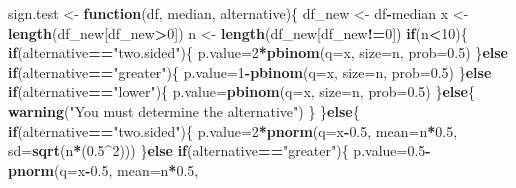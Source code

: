 \documentclass[]{book}
\newenvironment{Shaded}{\begin{snugshade}}{\end{snugshade}}
\newcommand{\KeywordTok}[1]{\textcolor[rgb]{0.13,0.29,0.53}{\textbf{#1}}}
\newcommand{\DataTypeTok}[1]{\textcolor[rgb]{0.13,0.29,0.53}{#1}}
\newcommand{\DecValTok}[1]{\textcolor[rgb]{0.00,0.00,0.81}{#1}}
\newcommand{\FloatTok}[1]{\textcolor[rgb]{0.00,0.00,0.81}{#1}}
\newcommand{\StringTok}[1]{\textcolor[rgb]{0.31,0.60,0.02}{#1}}
\newcommand{\ControlFlowTok}[1]{\textcolor[rgb]{0.13,0.29,0.53}{\textbf{#1}}}
\newcommand{\OperatorTok}[1]{\textcolor[rgb]{0.81,0.36,0.00}{\textbf{#1}}}
\newcommand{\NormalTok}[1]{#1}
\begin{document}
\begin{Shaded}
\begin{Highlighting}[]
\NormalTok{sign.test <-}\StringTok{ }\ControlFlowTok{function}\NormalTok{(df, median, alternative)\{}
\NormalTok{  df_new <-}\StringTok{ }\NormalTok{df}\OperatorTok{-}\NormalTok{median}
\NormalTok{  x <-}\StringTok{ }\KeywordTok{length}\NormalTok{(df_new[df_new}\OperatorTok{>}\DecValTok{0}\NormalTok{])}
\NormalTok{  n <-}\StringTok{ }\KeywordTok{length}\NormalTok{(df_new[df_new}\OperatorTok{!=}\DecValTok{0}\NormalTok{])}
  \ControlFlowTok{if}\NormalTok{(n}\OperatorTok{<}\DecValTok{10}\NormalTok{)\{}
    \ControlFlowTok{if}\NormalTok{(alternative}\OperatorTok{==}\StringTok{"two.sided"}\NormalTok{)\{}
\NormalTok{      p.value=}\DecValTok{2}\OperatorTok{*}\KeywordTok{pbinom}\NormalTok{(}\DataTypeTok{q=}\NormalTok{x, }\DataTypeTok{size=}\NormalTok{n, }\DataTypeTok{prob=}\FloatTok{0.5}\NormalTok{)}
\NormalTok{    \}}\ControlFlowTok{else} \ControlFlowTok{if}\NormalTok{(alternative}\OperatorTok{==}\StringTok{"greater"}\NormalTok{)\{}
\NormalTok{      p.value=}\DecValTok{1}\OperatorTok{-}\KeywordTok{pbinom}\NormalTok{(}\DataTypeTok{q=}\NormalTok{x, }\DataTypeTok{size=}\NormalTok{n, }\DataTypeTok{prob=}\FloatTok{0.5}\NormalTok{)}
\NormalTok{    \}}\ControlFlowTok{else} \ControlFlowTok{if}\NormalTok{(alternative}\OperatorTok{==}\StringTok{"lower"}\NormalTok{)\{}
\NormalTok{      p.value=}\KeywordTok{pbinom}\NormalTok{(}\DataTypeTok{q=}\NormalTok{x, }\DataTypeTok{size=}\NormalTok{n, }\DataTypeTok{prob=}\FloatTok{0.5}\NormalTok{)}
\NormalTok{    \}}\ControlFlowTok{else}\NormalTok{\{}
      \KeywordTok{warning}\NormalTok{(}\StringTok{"You must determine the alternative"}\NormalTok{)}
\NormalTok{    \}}
\NormalTok{  \}}\ControlFlowTok{else}\NormalTok{\{}
    \ControlFlowTok{if}\NormalTok{(alternative}\OperatorTok{==}\StringTok{"two.sided"}\NormalTok{)\{}
\NormalTok{      p.value=}\DecValTok{2}\OperatorTok{*}\KeywordTok{pnorm}\NormalTok{(}\DataTypeTok{q=}\NormalTok{x}\OperatorTok{-}\FloatTok{0.5}\NormalTok{, }\DataTypeTok{mean=}\NormalTok{n}\OperatorTok{*}\FloatTok{0.5}\NormalTok{, }
                      \DataTypeTok{sd=}\KeywordTok{sqrt}\NormalTok{(n}\OperatorTok{*}\NormalTok{(}\FloatTok{0.5}\OperatorTok{^}\DecValTok{2}\NormalTok{)))}
\NormalTok{    \}}\ControlFlowTok{else} \ControlFlowTok{if}\NormalTok{(alternative}\OperatorTok{==}\StringTok{"greater"}\NormalTok{)\{}
\NormalTok{      p.value=}\FloatTok{0.5}\OperatorTok{-}\KeywordTok{pnorm}\NormalTok{(}\DataTypeTok{q=}\NormalTok{x}\OperatorTok{-}\FloatTok{0.5}\NormalTok{, }\DataTypeTok{mean=}\NormalTok{n}\OperatorTok{*}\FloatTok{0.5}\NormalTok{, }

\end{Highlighting}
\end{Shaded}
\end{document}

